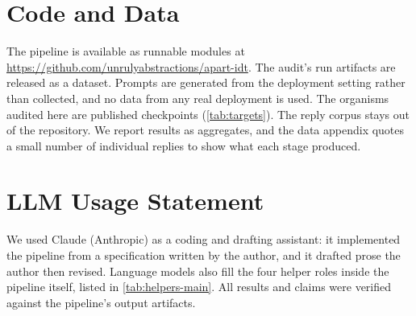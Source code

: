\section*{Code and Data}
\label{sec:code-and-data}

The pipeline is available as runnable modules at \url{https://github.com/unrulyabstractions/apart-idt}.
The audit's run artifacts are released as a dataset.
Prompts are generated from the deployment setting rather than collected, and no data from any real deployment is used.
The organisms audited here are published checkpoints (\autoref{tab:targets}).
The reply corpus stays out of the repository.
We report results as aggregates, and the data appendix quotes a small number of individual replies to show what each stage produced.

\section*{LLM Usage Statement}

We used Claude (Anthropic) as a coding and drafting assistant: it implemented the pipeline from a specification written by the author, and it drafted prose the author then revised.
Language models also fill the four helper roles inside the pipeline itself, listed in \autoref{tab:helpers-main}.
All results and claims were verified against the pipeline's output artifacts.
